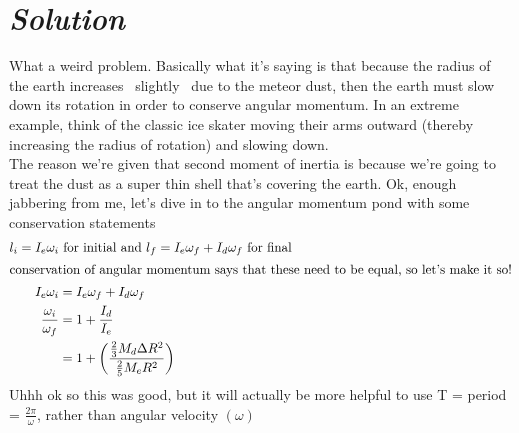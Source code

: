 \documentclass{article}
\begin{document}
\section*{\textit{Solution}} 
What a weird problem. Basically what it's saying is that because the radius of the earth increases ~slightly~ due to the meteor dust, then the earth must slow down its rotation in order to conserve angular momentum. In an extreme example, think of the classic ice skater moving their arms outward (thereby increasing the radius of rotation) and slowing down. \\
The reason we're given that second moment of inertia is because we're going to treat the dust as a super thin shell that's covering the earth. Ok, enough jabbering from me, let's dive in to the angular momentum pond with some conservation statements
\begin{align}
	l_i = I_e\omega_i &\text{ for initial and } l_f = I_e\omega_f + I_d\omega_f \text{ for final} \\
	\intertext{conservation of angular momentum says that these need to be equal, so let's make it so!} 
	I_e\omega_i &= I_e\omega_f + I_d\omega_f \\ 
	\frac{\omega_i}{ \omega_f} &= 1 + \frac{I_d}{I_e} \\ 
	&= 1 + \left( \frac{ \frac{2}{3} M_d \Delta R^2}{\frac{2}{5}M_e R^2} \right)
\end{align}
Uhhh ok so this was good, but it will actually be more helpful to use T = period = $\frac{2\pi}{\omega}$, rather than angular velocity $(\omega)$
\end{document}

